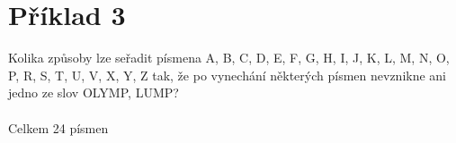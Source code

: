 \section*{Příklad 3}
Kolika způsoby lze seřadit písmena A, B, C, D, E, F, G, H, I, J, K, L, M, N, O, P, R, S, T, U, V, X,
Y, Z tak, že po vynechání některých písmen nevznikne ani jedno ze slov OLYMP, LUMP? \\\\
Celkem 24 písmen \\

